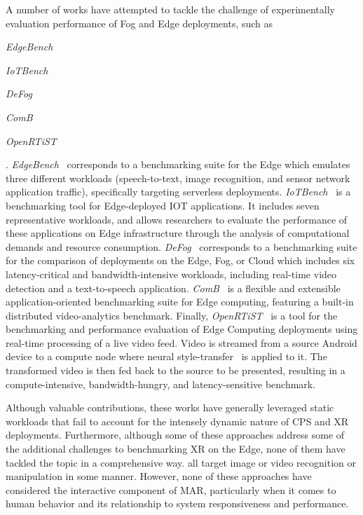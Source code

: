 A number of works have attempted to tackle the challenge of experimentally evaluation performance of Fog and Edge deployments, such as 
\begin{inlineenum}
    \item \emph{EdgeBench}~\cite{das2018edgebench}
    \item \emph{IoTBench}~\cite{lee2019iotbench}
    \item \emph{DeFog}~\cite{mcchesney2019defog}
    \item \emph{ComB}~\cite{baurle2022comb}
    \item \emph{OpenRTiST}~\cite{george2020openrtist}
\end{inlineenum}.
\emph{EdgeBench}~\cite{das2018edgebench} corresponds to a benchmarking suite for the Edge which emulates three different workloads (speech-to-text, image recognition, and sensor network application traffic), specifically targeting serverless deployments.\@
\emph{IoTBench}~\cite{lee2019iotbench} is a benchmarking tool for Edge-deployed \gls{IOT} applications.
It includes seven representative workloads, and allows researchers to evaluate the performance of these applications on Edge infrastructure through the analysis of computational demands and resource consumption.\@
\emph{DeFog}~\cite{mcchesney2019defog} corresponds to a benchmarking suite for the comparison of deployments on the Edge, Fog, or Cloud which includes six latency-critical and bandwidth-intensive workloads, including real-time video detection and a text-to-speech application.
\emph{ComB}~\cite{baurle2022comb} is a flexible and extensible application-oriented benchmarking suite for Edge computing, featuring a built-in distributed video-analytics benchmark.
Finally, \emph{OpenRTiST}~\cite{george2020openrtist} is a tool for the benchmarking and performance evaluation of Edge Computing deployments using real-time processing of a live video feed.
Video is streamed from a source Android device to a compute node where neural style-transfer~\cite{gatys2016image} is applied to it.
The transformed video is then fed back to the source to be presented, resulting in a compute-intensive, bandwidth-hungry, and latency-sensitive benchmark.

Although valuable contributions, these works have generally leveraged static workloads that fail to account for the intensely dynamic nature of \gls{CPS} and \gls{XR} deployments.
Furthermore, although some of these approaches address some of the additional challenges to benchmarking \gls{XR} on the Edge, none of them have tackled the topic in a comprehensive way.\@
\cite{das2018edgebench,mcchesney2019defog,baurle2022comb,george2020openrtist} all target image or video recognition or manipulation in some manner.
However, none of these approaches have considered the interactive component of \gls{MAR}, particularly when it comes to human behavior and its relationship to system responsiveness and performance.


